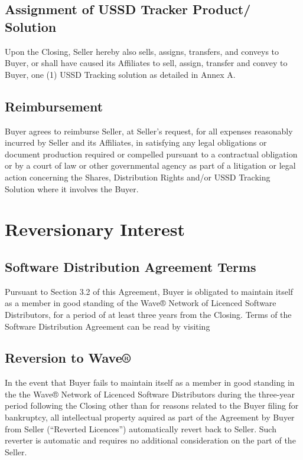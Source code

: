 \documentclass[letterpaper,10pt,english]{sphinxmanual}
\begin{document}
\subsection{Assignment of USSD Tracker Product/ Solution}
\label{\detokenize{3-transfer:assignment-of-ussd-tracker-product-solution}}
Upon the Closing, Seller hereby also sells, assigns, transfers, and conveys to Buyer, or shall have caused its Affiliates to sell, assign, transfer and convey to Buyer, one (1) USSD Tracking solution as detailed in Annex A.


\subsection{Reimbursement}
\label{\detokenize{3-transfer:reimbursement}}
Buyer agrees to reimburse Seller, at Seller’s request, for all expenses reasonably incurred by Seller and its Affiliates, in satisfying any legal obligations or document production required or compelled pursuant to a contractual obligation or by a court of law or other governmental agency as part of a litigation or legal action concerning the Shares, Distribution Rights and/or USSD Tracking Solution where it involves the Buyer.


\section{Reversionary Interest}
\label{\detokenize{4-reversionary:reversionary-interest}}\label{\detokenize{4-reversionary::doc}}

\subsection{Software Distribution Agreement Terms}
\label{\detokenize{4-reversionary:software-distribution-agreement-terms}}
Pursuant to Section 3.2 of this Agreement, Buyer is obligated to maintain itself as a member in good standing of the Wave® Network of Licenced Software Distributors, for a period of at least three years from the Closing. Terms of the Software Distribution Agreement can be read by visiting 


\subsection{Reversion to Wave®}
\label{\detokenize{4-reversionary:reversion-to-wave}}
In the event that Buyer fails to maintain itself as a member in good standing in the the Wave® Network of Licenced Software Distributors during the three-year period following the Closing other than for reasons related to the Buyer filing for bankruptcy, all intellectual property aquired as part of the Agreement by Buyer from Seller (“Reverted Licences”) automatically revert back to Seller. Such reverter is automatic and requires no additional consideration on the part of the Seller.
\end{document}
